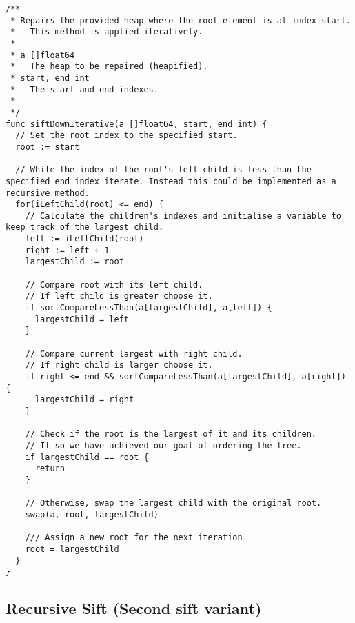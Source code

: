\documentclass{article}
\begin{document}
\begin{lstlisting}[language=Golang, caption=The procedure which restores the properties of the heap following the removal of the root node. This implementation follows the pseudocode listed earlier which operates iteratively.]
/**
 * Repairs the provided heap where the root element is at index start.
 *   This method is applied iteratively.
 *
 * a []float64
 *   The heap to be repaired (heapified).
 * start, end int
 *   The start and end indexes.
 *
 */
func siftDownIterative(a []float64, start, end int) {
  // Set the root index to the specified start.
  root := start

  // While the index of the root's left child is less than the specified end index iterate. Instead this could be implemented as a recursive method.
  for(iLeftChild(root) <= end) {
    // Calculate the children's indexes and initialise a variable to keep track of the largest child.
    left := iLeftChild(root)
    right := left + 1
    largestChild := root

    // Compare root with its left child.
    // If left child is greater choose it.
    if sortCompareLessThan(a[largestChild], a[left]) {
      largestChild = left
    }

    // Compare current largest with right child.
    // If right child is larger choose it.
    if right <= end && sortCompareLessThan(a[largestChild], a[right]) {
      largestChild = right
    }

    // Check if the root is the largest of it and its children.
    // If so we have achieved our goal of ordering the tree.
    if largestChild == root {
      return
    }

    // Otherwise, swap the largest child with the original root.
    swap(a, root, largestChild)

    /// Assign a new root for the next iteration.
    root = largestChild
  }
}
\end{lstlisting}

\subsection{Recursive Sift (Second sift variant)}
\end{document}
